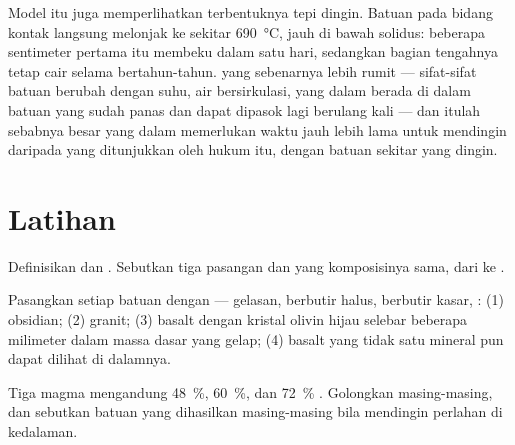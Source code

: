 Model itu juga memperlihatkan terbentuknya tepi dingin. Batuan pada bidang
kontak langsung melonjak ke sekitar \qty{690}{\degreeCelsius}, jauh di bawah
solidus: beberapa sentimeter pertama  itu membeku dalam satu hari,
sedangkan bagian tengahnya tetap cair selama bertahun-tahun.  yang
sebenarnya lebih rumit --- sifat-sifat batuan berubah dengan suhu, air
bersirkulasi,  yang dalam berada di dalam batuan yang sudah panas dan
dapat dipasok lagi berulang kali --- dan itulah sebabnya  besar yang
dalam memerlukan waktu jauh lebih lama untuk mendingin daripada yang
ditunjukkan oleh hukum itu, dengan batuan sekitar yang dingin.

\section{Latihan}

\begin{exercise}[$\star$]\label{exo:g11:igneous-rocks:1}
Definisikan  dan . Sebutkan tiga pasangan  dan  yang komposisinya sama, dari  ke .
\end{exercise}

\begin{exercise}[$\star$]\label{exo:g11:igneous-rocks:2}
Pasangkan setiap batuan dengan  --- gelasan, berbutir halus, berbutir
kasar, : (1) obsidian; (2) granit; (3) basalt dengan kristal olivin
hijau selebar beberapa milimeter dalam massa dasar yang gelap; (4) basalt yang
tidak satu mineral pun dapat dilihat di dalamnya.
\end{exercise}

\begin{exercise}[$\star$]\label{exo:g11:igneous-rocks:3}
Tiga magma mengandung \qty{48}{\percent}, \qty{60}{\percent}, dan
\qty{72}{\percent} . Golongkan masing-masing, dan sebutkan batuan yang
dihasilkan masing-masing bila mendingin perlahan di kedalaman.
\end{exercise}

